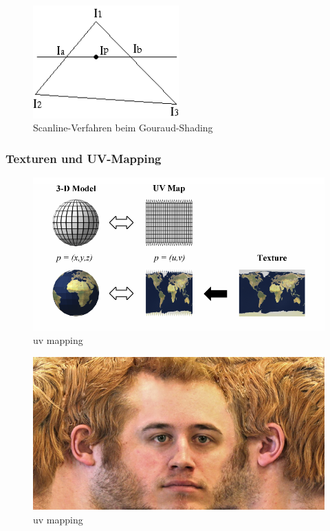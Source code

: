 \begin{figure}[H]
    \centering
    \includegraphics[width=0.5\textwidth]{images/gouraud_scanline.png}
    \caption{Scanline-Verfahren beim Gouraud-Shading}
    \label{fig:gouraud-shading-scanline}
\end{figure}



\subsubsection{Texturen und UV-Mapping}
\begin{figure}[H]
    \centering
    \includegraphics[width=1.0\textwidth]{images/tm_uv.png}
    \caption{uv mapping} %
    \label{fig:uv-mapping1}
\end{figure}

\begin{figure}[H]
    \centering
    \includegraphics[width=1.0\textwidth]{images/tm_face.jpg}
    \caption{uv mapping} %
    \label{fig:uv-mapping2}
\end{figure}




